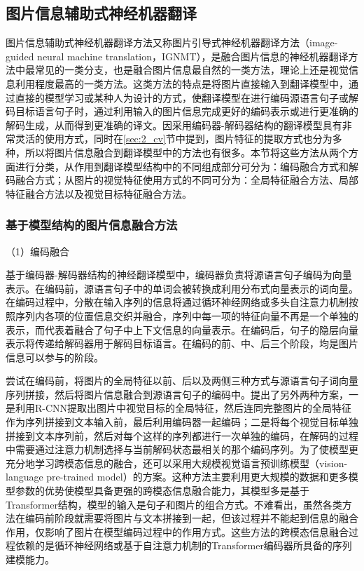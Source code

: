 \subsection{图片信息辅助式神经机器翻译}
\label{sec:2_ignmt}

图片信息辅助式神经机器翻译方法又称图片引导式神经机器翻译方法（image-guided neural machine translation，IGNMT），是融合图片信息的神经机器翻译方法中最常见的一类分支，也是融合图片信息最自然的一类方法，理论上还是视觉信息利用程度最高的一类方法。这类方法的特点是将图片直接输入到翻译模型中，通过直接的模型学习或某种人为设计的方式，使翻译模型在进行编码源语言句子或解码目标语言句子时，通过利用输入的图片信息完成更好的编码表示或进行更准确的解码生成，从而得到更准确的译文。因采用编码器-解码器结构的翻译模型具有非常灵活的使用方式，同时在\ref{sec:2_cv}节中提到，图片特征的提取方式也分为多种，所以将图片信息融合到翻译模型中的方法也有很多。本节将这些方法从两个方面进行分类，从作用到翻译模型结构中的不同组成部分可分为：编码融合方式和解码融合方式；从图片的视觉特征使用方式的不同可分为：全局特征融合方法、局部特征融合方法以及视觉目标特征融合方法。

\subsubsection{基于模型结构的图片信息融合方法}

{\sffamily （1）编码融合}

基于编码器-解码器结构的神经翻译模型中，编码器负责将源语言句子编码为向量表示。在编码前，源语言句子中的单词会被转换成利用分布式向量表示的词向量。在编码过程中，分散在输入序列的信息将通过循环神经网络或多头自注意力机制按照序列内各项的位置信息交织并融合，序列中每一项的特征向量不再是一个单独的表示，而代表着融合了句子中上下文信息的向量表示。在编码后，句子的隐层向量表示将传递给解码器用于解码目标语言。在编码的前、中、后三个阶段，均是图片信息可以参与的阶段。

尝试在编码前，将图片的全局特征以前、后以及两侧三种方式与源语言句子词向量序列拼接，然后将图片信息融合到源语言句子的编码中。提出了另外两种方案，一是利用R-CNN提取出图片中视觉目标的全局特征，然后连同完整图片的全局特征作为序列拼接到文本输入前，最后利用编码器一起编码；二是将每个视觉目标单独拼接到文本序列前，然后对每个这样的序列都进行一次单独的编码，在解码的过程中需要通过注意力机制选择与当前解码状态最相关的那个编码序列。为了使模型更充分地学习跨模态信息的融合，还可以采用大规模视觉语言预训练模型（vision-language pre-trained model）的方案。这种方法主要利用更大规模的数据和更多模型参数的优势使模型具备更强的跨模态信息融合能力，其模型多是基于Transformer结构，模型的输入是句子和图片的组合方式。不难看出，虽然各类方法在编码前阶段就需要将图片与文本拼接到一起，但该过程并不能起到信息的融合作用，仅影响了图片在模型编码过程中的作用方式。这些方法的跨模态信息融合过程依赖的是循环神经网络或基于自注意力机制的Transformer编码器所具备的序列建模能力。

